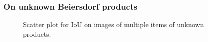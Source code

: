 \subsubsection{On unknown Beiersdorf products}\label{subsec:resunknownprod}
\begin{figure}[h]
 \centering
 \hfill
 \caption{Scatter plot for IoU on images of multiple items of unknown products.}
 \label{figure: unknownproducts}
\end{figure}

